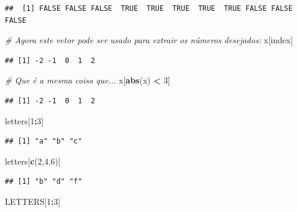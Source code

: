 \documentclass[
]{book}
\newenvironment{Shaded}{\begin{snugshade}}{\end{snugshade}}
\newcommand{\CommentTok}[1]{\textcolor[rgb]{0.56,0.35,0.01}{\textit{#1}}}
\newcommand{\DecValTok}[1]{\textcolor[rgb]{0.00,0.00,0.81}{#1}}
\newcommand{\FunctionTok}[1]{\textcolor[rgb]{0.13,0.29,0.53}{\textbf{#1}}}
\newcommand{\NormalTok}[1]{#1}
\newcommand{\SpecialCharTok}[1]{\textcolor[rgb]{0.81,0.36,0.00}{\textbf{#1}}}
\theoremstyle{definition}
\theoremstyle{definition}
\theoremstyle{definition}
\theoremstyle{definition}
\theoremstyle{remark}
\begin{document}
\begin{verbatim}
##  [1] FALSE FALSE FALSE  TRUE  TRUE  TRUE  TRUE  TRUE FALSE FALSE FALSE
\end{verbatim}

\begin{Shaded}
\begin{Highlighting}[]
\CommentTok{\# Agora este vetor pode ser usado para extrair os números desejados:}
\NormalTok{x[index]}
\end{Highlighting}
\end{Shaded}

\begin{verbatim}
## [1] -2 -1  0  1  2
\end{verbatim}

\begin{Shaded}
\begin{Highlighting}[]
\CommentTok{\# Que é a mesma coisa que...}
\NormalTok{x[}\FunctionTok{abs}\NormalTok{(x) }\SpecialCharTok{\textless{}} \DecValTok{3}\NormalTok{]}
\end{Highlighting}
\end{Shaded}

\begin{verbatim}
## [1] -2 -1  0  1  2
\end{verbatim}

\begin{Shaded}
\begin{Highlighting}[]
\NormalTok{letters[}\DecValTok{1}\SpecialCharTok{:}\DecValTok{3}\NormalTok{]}
\end{Highlighting}
\end{Shaded}

\begin{verbatim}
## [1] "a" "b" "c"
\end{verbatim}

\begin{Shaded}
\begin{Highlighting}[]
\NormalTok{letters[}\FunctionTok{c}\NormalTok{(}\DecValTok{2}\NormalTok{,}\DecValTok{4}\NormalTok{,}\DecValTok{6}\NormalTok{)]}
\end{Highlighting}
\end{Shaded}

\begin{verbatim}
## [1] "b" "d" "f"
\end{verbatim}

\begin{Shaded}
\begin{Highlighting}[]
\NormalTok{LETTERS[}\DecValTok{1}\SpecialCharTok{:}\DecValTok{3}\NormalTok{]}
\end{Highlighting}
\end{Shaded}
\end{document}
